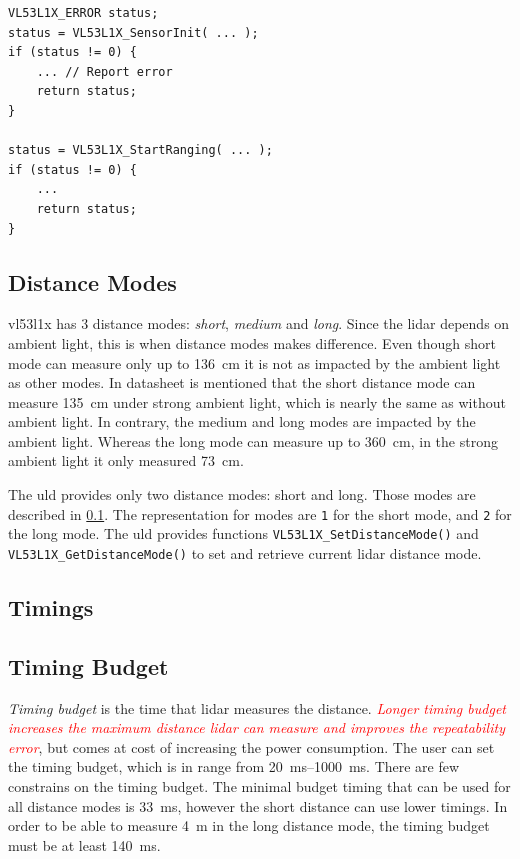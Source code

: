 \documentclass[
  digital,     %
  oneside,     %
  nosansbold,  %
  nocolorbold, %
  lof,         %
  lot,         %
]{fithesis4}
\newcommand{\TODO}[1]{\textcolor{red}{\textit{#1}}}
\begin{document}
{{{\begin{lstlisting}[float, caption={Structure of error handling of the \acrshort{uld} function calls.}, captionpos=b]
VL53L1X_ERROR status;
status = VL53L1X_SensorInit( ... );
if (status != 0) {
    ... // Report error
    return status;
}

status = VL53L1X_StartRanging( ... );
if (status != 0) {
    ...
    return status;
}
\end{lstlisting}

\subsection{ Distance Modes } \label{distance-modes}

\gls{vl53l1x} has 3 distance modes: \emph{short}, \emph{medium} and \emph{long}. Since the \acrshort{lidar} depends on ambient light, this is when distance modes makes difference. Even though short mode can measure only up to \qty{136}{\centi\metre} it is not as impacted by the ambient light as other modes. In datasheet \cite{vl53l1x} is mentioned that the short distance mode can measure \qty{135}{\centi\metre} under strong ambient light, which is nearly the same as without ambient light. In contrary, the medium and long modes are impacted by the ambient light. Whereas the long mode can measure up to \qty{360}{\centi\metre}, in the strong ambient light it only measured \qty{73}{\centi\metre}.

The \acrshort{uld} provides only two distance modes: short and long. Those modes are described in \ref{distance-modes}. The representation for modes are \lstinline|1| for the short mode, and \lstinline|2| for the long mode. The \acrshort{uld} provides functions \lstinline|VL53L1X_SetDistanceMode()| and \lstinline|VL53L1X_GetDistanceMode()| to set and retrieve current \acrshort{lidar} distance mode.

\subsection{ Timings }


\subsection{ Timing Budget } \label{TB}

\emph{Timing budget} is the time that \acrshort{lidar} measures the distance. \TODO{ Longer timing budget increases the maximum distance \acrshort{lidar} can measure and improves the repeatability error}, but comes at cost of increasing the power consumption. The user can set the timing budget, which is in range from \qtyrange{20}{1000}{\milli\second}. There are few constrains on the timing budget. The minimal budget timing that can be used for all distance modes is \qty{33}{\milli\second}, however the short distance can use lower timings. In order to be able to measure \qty{4}{\metre} in the long distance mode, the timing budget must be at least \qty{140}{\milli\second}.

}}}
\end{document}
